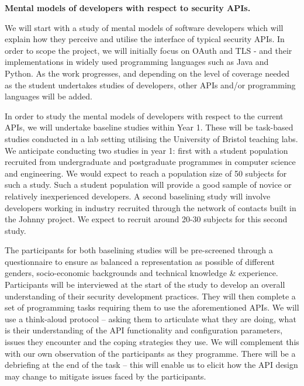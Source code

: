 \documentclass[10pt]{article}
\begin{document}
\begin{description}\itemsep-3pt
\item[WP 1] \textbf{Mental models of developers with respect to security APIs.}

We will start with a study of mental models of software developers which will explain how they perceive and utilise the interface of typical security APIs. In order to scope the project, we will initially focus on OAuth and TLS - and their implementations in widely used programming languages such as Java and Python. As the work progresses, and depending on the level of coverage needed as the student undertakes studies of developers, other APIs and/or programming languages will be added.

In order to study the mental models of developers with respect to the current APIs, we will undertake baseline studies within Year 1. These will be task-based studies conducted in a lab setting utilising the University of Bristol teaching labs. We anticipate conducting two studies in year 1: first with a student population recruited from undergraduate and postgraduate programmes in computer science and engineering. We would expect to reach a population size of 50 subjects for such a study. Such a student population will provide a good sample of novice or relatively inexperienced developers. A second baselining study will involve developers working in industry recruited through the network of contacts built in the Johnny project. We expect to recruit around 20-30 subjects for this second study.

The participants for both baselining studies will be pre-screened through a questionnaire to ensure as balanced a representation as possible of different genders, socio-economic backgrounds and technical knowledge \& experience. Participants will be interviewed at the start of the study to develop an overall understanding of their security development practices. They will then complete a set of programming tasks requiring them to use the aforementioned APIs. We will use a think-aloud protocol -- asking them to articulate what they are doing, what is their understanding of the API functionality and configuration parameters, issues they encounter and the coping strategies they use. We will complement this with our own observation of the participants as they programme. There will be a debriefing at the end of the task -- this will enable us to elicit how the API design may change to mitigate issues faced by the participants.


\end{description}
\end{document}
